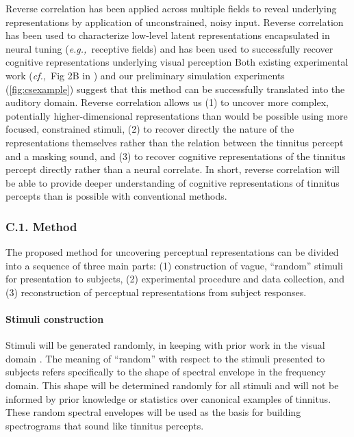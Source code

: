 \documentclass[11pt, notitlepage]{article} %
\def\eg{{\emph{e.g.,}}~}
\def\cf{{\emph{cf.,}}~}
\begin{document}
Reverse correlation has been applied across multiple fields to reveal underlying representations by application of unconstrained, noisy input.
Reverse correlation has been used to characterize low-level latent representations encapsulated in neural tuning
(\eg receptive fields) \cite{ringachReverseCorrelationNeurophysiology2004}
and has been used to successfully recover cognitive representations underlying visual perception \cite{gosselinSuperstitiousPerceptionsReveal2003,}
Both existing experimental work (\cf Fig 2B in \cite{brimijoinInternalRepresentationVowel2013})
and our preliminary simulation experiments (\autoref{fig:csexample}) suggest that this method can be successfully translated
into the auditory domain.
Reverse correlation allows us (1) to uncover more complex, potentially higher-dimensional representations
than would be possible using more focused, constrained stimuli,
(2) to recover directly the nature of the representations themselves rather than the relation
between the tinnitus percept and a masking sound,
and (3) to recover cognitive representations of the tinnitus percept directly rather than a neural correlate.
In short, reverse correlation will be able to provide deeper understanding of cognitive representations of tinnitus percepts
than is possible with conventional methods.

\subsubsection*{C.1. Method}

The proposed method for uncovering perceptual representations can be divided
into a sequence of three main parts:
(1) construction of vague, ``random'' stimuli for presentation to subjects,
(2) experimental procedure and data collection,
and (3) reconstruction of perceptual representations from subject responses.


\paragraph{Stimuli construction}

Stimuli will be generated randomly, in keeping with prior work in the visual domain
\cite{gosselinSuperstitiousPerceptionsReveal2003}.
The meaning of ``random'' with respect to the stimuli presented to subjects
refers specifically to the shape of spectral envelope in the frequency domain.
This shape will be determined randomly for all stimuli
and will not be informed by prior knowledge
or statistics over canonical examples of tinnitus.
These random spectral envelopes will be used as the basis for building spectrograms
that sound like tinnitus percepts.
\end{document}
